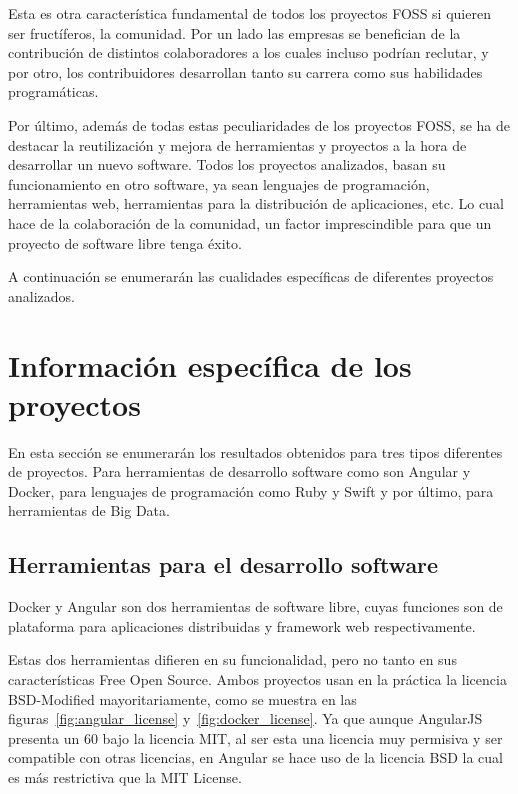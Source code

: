 \documentclass[a4paper, spanish, 12pt]{book}
\begin{document}
Esta es otra caracter\'istica fundamental de todos los proyectos FOSS si quieren ser fruct\'iferos, la comunidad.
Por un lado las empresas se benefician de la contribuci\'on de distintos colaboradores a los cuales incluso
podr\'ian reclutar, y por otro, los contribuidores desarrollan tanto su carrera como sus habilidades program\'aticas.

Por \'ultimo, adem\'as de todas estas peculiaridades de los proyectos FOSS, se ha de destacar la reutilizaci\'on y
mejora de herramientas y proyectos a la hora de desarrollar un nuevo software. Todos los proyectos analizados,
basan su funcionamiento en otro software, ya sean lenguajes de programaci\'on, herramientas web, herramientas para
la distribuci\'on de aplicaciones, etc. Lo cual hace de la colaboraci\'on de la comunidad, un factor imprescindible
para que un proyecto de software libre tenga \'exito.

A continuaci\'on se enumerar\'an las cualidades espec\'ificas de diferentes proyectos analizados.

\section{Informaci\'on espec\'ifica de los proyectos}
\label{sec:specific_info}

En esta secci\'on se enumerar\'an los resultados obtenidos para tres tipos diferentes de proyectos.
Para herramientas de desarrollo software como son Angular y Docker, para lenguajes de programaci\'on como
Ruby y Swift y por \'ultimo, para herramientas de Big Data.

\subsection{Herramientas para el desarrollo software}
\label{subsec:software_tools}

Docker y Angular son dos herramientas de software libre, cuyas funciones son de plataforma para aplicaciones distribuidas
y framework web respectivamente.

Estas dos herramientas difieren en su funcionalidad, pero no tanto en sus caracter\'isticas Free Open Source.
Ambos proyectos usan en la pr\'actica la licencia BSD-Modified mayoritariamente, como se muestra en las
figuras~\ref{fig:angular_license} y~\ref{fig:docker_license}. Ya que aunque AngularJS presenta un 60%
bajo la licencia MIT, al ser esta una licencia muy permisiva y ser compatible con otras licencias,
en Angular se hace uso de la licencia BSD la cual es m\'as restrictiva que la MIT License.
\end{document}
